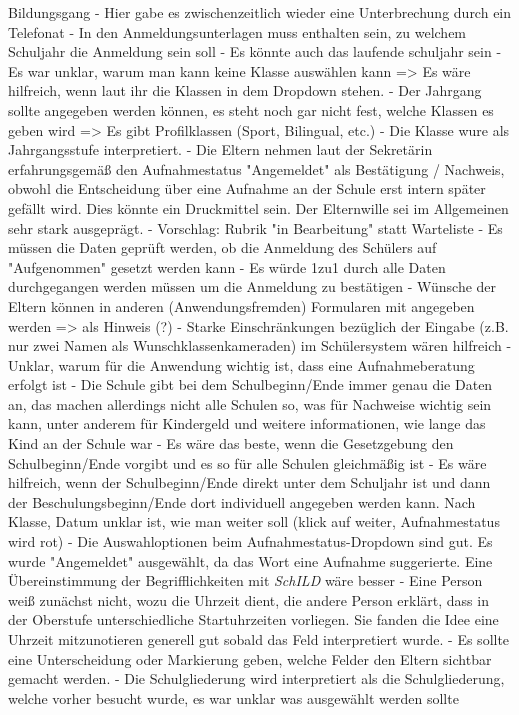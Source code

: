 Bildungsgang
- Hier gabe es zwischenzeitlich wieder eine Unterbrechung durch ein Telefonat
- In den Anmeldungsunterlagen muss enthalten sein, zu welchem Schuljahr die Anmeldung sein soll
- Es könnte auch das laufende schuljahr sein
- Es war unklar, warum man kann keine Klasse auswählen kann => Es wäre hilfreich, wenn laut ihr die Klassen in dem Dropdown stehen. 
- Der Jahrgang sollte angegeben werden können, es steht noch gar nicht fest, welche Klassen es geben wird => Es gibt Profilklassen (Sport, Bilingual, etc.)
- Die Klasse wure als Jahrgangsstufe interpretiert.
- Die Eltern nehmen laut der Sekretärin erfahrungsgemäß den Aufnahmestatus "Angemeldet" als Bestätigung / Nachweis, obwohl die Entscheidung über eine Aufnahme an der Schule erst intern später gefällt wird. Dies könnte ein Druckmittel sein. Der Elternwille sei im Allgemeinen sehr stark ausgeprägt.
- Vorschlag: Rubrik "in Bearbeitung" statt Warteliste
- Es müssen die Daten geprüft werden, ob die Anmeldung des Schülers auf "Aufgenommen" gesetzt werden kann
- Es würde 1zu1 durch alle Daten durchgegangen werden müssen um die Anmeldung zu bestätigen
- Wünsche der Eltern können in anderen (Anwendungsfremden) Formularen mit angegeben werden => als Hinweis (?)
- Starke Einschränkungen bezüglich der Eingabe (z.B. nur zwei Namen als Wunschklassenkameraden) im Schülersystem wären hilfreich
- Unklar, warum für die Anwendung wichtig ist, dass eine Aufnahmeberatung erfolgt ist
- Die Schule gibt bei dem Schulbeginn/Ende immer genau die Daten an, das machen allerdings nicht alle Schulen so, was für Nachweise wichtig sein kann, unter anderem für Kindergeld und weitere informationen, wie lange das Kind an der Schule war
    - Es wäre das beste, wenn die Gesetzgebung den Schulbeginn/Ende vorgibt und es so für alle Schulen gleichmäßig ist
    - Es wäre hilfreich, wenn der Schulbeginn/Ende direkt unter dem Schuljahr ist und dann der Beschulungsbeginn/Ende dort individuell angegeben werden kann. Nach Klasse, Datum unklar ist, wie man weiter soll (klick auf weiter, Aufnahmestatus wird rot)
- Die Auswahloptionen beim Aufnahmestatus-Dropdown sind gut. Es wurde "Angemeldet" ausgewählt, da das Wort eine Aufnahme suggerierte. Eine Übereinstimmung der Begrifflichkeiten mit \textit{SchILD} wäre besser
- Eine Person weiß zunächst nicht, wozu die Uhrzeit dient, die andere Person erklärt, dass in der Oberstufe unterschiedliche Startuhrzeiten vorliegen. Sie fanden die Idee eine Uhrzeit mitzunotieren generell gut sobald das Feld interpretiert wurde. 
- Es sollte eine Unterscheidung oder Markierung geben, welche Felder den Eltern sichtbar gemacht werden.
- Die Schulgliederung wird interpretiert als die Schulgliederung, welche vorher besucht wurde, es war unklar was ausgewählt werden sollte
 	


